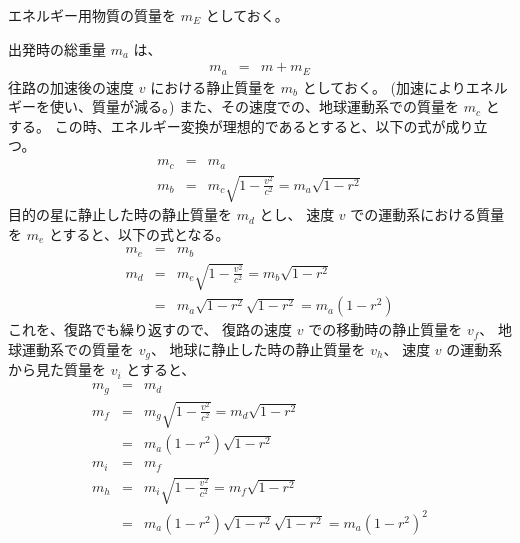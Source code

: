 エネルギー用物質の質量を $m_E$ としておく。

出発時の総重量 $m_a$ は、
  \begin{eqnarray}
    m_a & = & m + m_E
  \end{eqnarray}
往路の加速後の速度 $v$ における静止質量を $m_b$ としておく。
(加速によりエネルギーを使い、質量が減る。)
また、その速度での、地球運動系での質量を $m_c$ とする。
この時、エネルギー変換が理想的であるとすると、以下の式が成り立つ。
  \begin{eqnarray}
    m_c & = & m_a
  \\
    m_b & = & m_c \sqrt{1 - \frac{v^2}{c^2}} = m_a \sqrt{1 - r^2}
  \end{eqnarray}
目的の星に静止した時の静止質量を $m_d$ とし、
速度 $v$ での運動系における質量を $m_e$ とすると、以下の式となる。
  \begin{eqnarray}
    m_e & = & m_b
  \\
    m_d & = & m_e \sqrt{1 - \frac{v^2}{c^2}} = m_b \sqrt{1 - r^2}
  \\
        & = & m_a \sqrt{1 - r^2} \sqrt{1 - r^2} = m_a (1 - r^2)
  \end{eqnarray}
これを、復路でも繰り返すので、
復路の速度 $v$ での移動時の静止質量を $v_f$、
地球運動系での質量を $v_g$、
地球に静止した時の静止質量を $v_h$、
速度 $v$ の運動系から見た質量を $v_i$ とすると、
  \begin{eqnarray}
    m_g & = & m_d
  \\
    m_f & = & m_g \sqrt{1 - \frac{v^2}{c^2}} = m_d \sqrt{1 - r^2}
  \\
        & = & m_a (1 - r^2) \sqrt{1 - r^2}
  \\
    m_i & = & m_f
  \\
    m_h & = & m_i \sqrt{1 - \frac{v^2}{c^2}} = m_f \sqrt{1 - r^2}
  \\
        & = & m_a (1 - r^2) \sqrt{1 - r^2} \sqrt{1 - r^2} = m_a(1 - r^2)^2
  \end{eqnarray}
